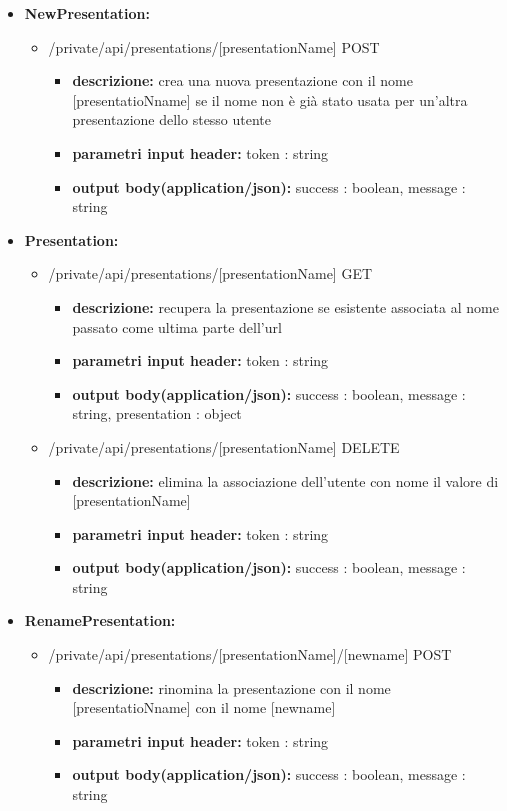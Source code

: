 {{\begin{itemize}
		\item \textbf{NewPresentation:}
			\begin{itemize}
			\item  /private/api/presentations/[presentationName] POST
				\begin{itemize} 
				\item \textbf{descrizione:} crea una nuova presentazione con il nome [presentatioNname] se il nome non \`{e} gi\`{a} stato usata per un'altra presentazione dello stesso utente
				\item \textbf{parametri input header:} token : string
				\item \textbf{output body(application/json):}  success : boolean, message : string
				\end{itemize}
			\end{itemize}
			
		\item \textbf{Presentation:}
			\begin{itemize}
			\item  /private/api/presentations/[presentationName] GET
				\begin{itemize} 
				\item \textbf{descrizione:} recupera la presentazione se esistente associata al nome passato come ultima parte dell'url
				\item \textbf{parametri input header:} token : string
				\item \textbf{output body(application/json):}  success : boolean, message : string, presentation : object
				\end{itemize}
			\item  /private/api/presentations/[presentationName] DELETE
				\begin{itemize} 
				\item \textbf{descrizione:} elimina la associazione dell'utente con nome il valore di [presentationName]
				\item \textbf{parametri input header:} token : string
				\item \textbf{output body(application/json):}  success : boolean, message : string
				\end{itemize}
			\end{itemize}

		\item \textbf{RenamePresentation:}
			\begin{itemize}
			\item  /private/api/presentations/[presentationName]/[newname] POST
				\begin{itemize} 
				\item \textbf{descrizione:} rinomina la presentazione con il nome [presentatioNname] con il nome [newname]
				\item \textbf{parametri input header:} token : string
				\item \textbf{output body(application/json):}  success : boolean, message : string
				\end{itemize}
			\end{itemize}
			

\end{itemize}}}
